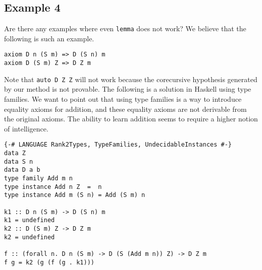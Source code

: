 \documentclass{llncs}
\begin{document}
\subsection{Example 4}
\label{DZ}
Are there any examples where even \texttt{lemma} does not work? We believe that
the following is such an example.
\begin{verbatim}
axiom D n (S m) => D (S n) m
axiom D (S m) Z => D Z m
\end{verbatim}

Note that \texttt{auto D Z Z} will not work because the corecursive hypothesis
generated by our method is not provable. The following is a solution in Haskell
using type families. We want to point out that using type families is a way to
introduce equality axioms for addition, and these equality axioms are not
derivable from the original axioms. The ability to learn addition seems to
require a higher notion of intelligence.    

\begin{verbatim}
{-# LANGUAGE Rank2Types, TypeFamilies, UndecidableInstances #-}
data Z
data S n
data D a b
type family Add m n
type instance Add n Z  =  n
type instance Add m (S n) = Add (S m) n

k1 :: D n (S m) -> D (S n) m
k1 = undefined
k2 :: D (S m) Z -> D Z m
k2 = undefined

f :: (forall n. D n (S m) -> D (S (Add m n)) Z) -> D Z m
f g = k2 (g (f (g . k1)))
\end{verbatim}
 
\end{document}
